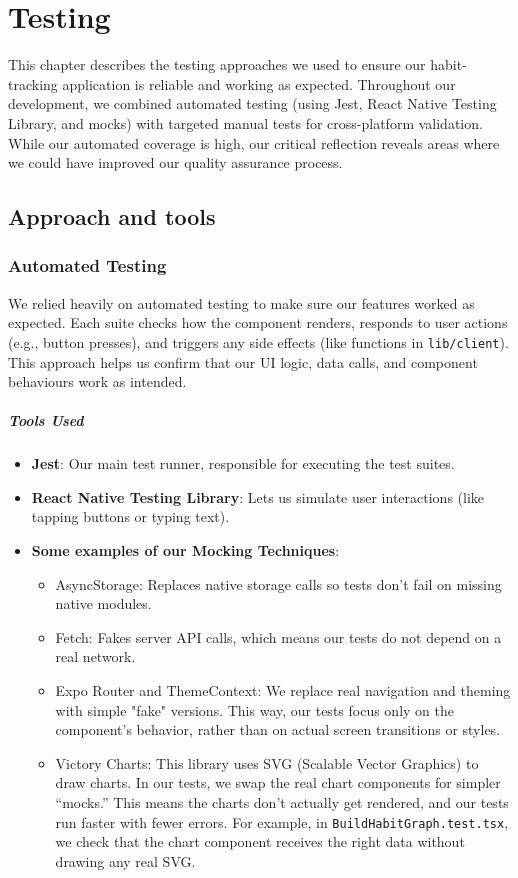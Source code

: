 \chapter{Testing}
\label{chap:testing}

This chapter describes the testing approaches we used to ensure our habit-tracking application is reliable and working as expected. Throughout our development, we combined automated testing (using Jest, React Native Testing Library, and mocks) with targeted manual tests for cross-platform validation. While our automated coverage is high, our critical reflection reveals areas where we could have improved our quality assurance process.

\section{Approach and tools} \label{sect:testing:approach}

\subsection{Automated Testing}

We relied heavily on automated testing to make sure our features worked as expected. Each suite checks how the component renders, responds to user actions (e.g., button presses), and triggers any side effects (like functions in \texttt{lib/client}). This approach helps us confirm that our UI logic, data calls, and component behaviours work as intended.

\paragraph{Tools Used} \begin{itemize} \item \textbf{Jest}: Our main test runner, responsible for executing the test suites. \item \textbf{React Native Testing Library}: Lets us simulate user interactions (like tapping buttons or typing text). \item \textbf{Some examples of our Mocking Techniques}: \begin{itemize} \item{AsyncStorage}: Replaces native storage calls so tests don’t fail on missing native modules. \item{Fetch}: Fakes server API calls, which means our tests do not depend on a real network. \item {Expo Router and ThemeContext:}
We replace real navigation and theming with simple "fake" versions. This way, our tests focus only on the component’s behavior, rather than on actual screen transitions or styles. \item {Victory Charts}: This library uses SVG (Scalable Vector Graphics) to draw charts. In our tests, we swap the real chart components for simpler “mocks.” This means the charts don’t actually get rendered, and our tests run faster with fewer errors. For example, in \texttt{BuildHabitGraph.test.tsx}, we check that the chart component receives the right data without drawing any real SVG. \end{itemize} \end{itemize}



